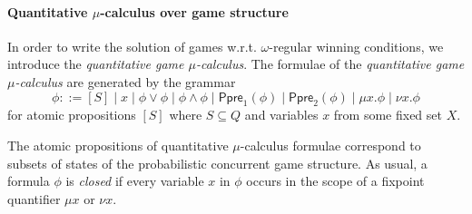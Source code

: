 \documentclass[times, 10 pt,twocolumn]{article}
\newcommand{\Ppre}{\textsf{Ppre}}
\begin{document}

\paragraph{Quantitative $\mu$-calculus over game structure}
In order to write the solution of games w.r.t. $\omega$-regular
winning conditions, we introduce the \emph{quantitative game
$\mu$-calculus}. The formulae of the \emph{quantitative game
$\mu$-calculus} are generated by the grammar
\[
\phi::= [S] \mid x \mid \phi\vee\phi \mid \phi\wedge\phi \mid
\Ppre_1(\phi)\mid \Ppre_2(\phi) \mid \mu x.\phi\mid \nu x.\phi
\]
for atomic propositions $[S]$ where $S\subseteq Q$ and variables
$x$ from some fixed set $X$.

The atomic propositions of quantitative $\mu$-calculus formulae
correspond to subsets of states of the probabilistic concurrent
game structure. As usual, a formula $\phi$ is \emph{closed} if
every variable $x$ in $\phi$ occurs in the scope of a fixpoint
quantifier $\mu x$ or $\nu x$.
\end{document}
